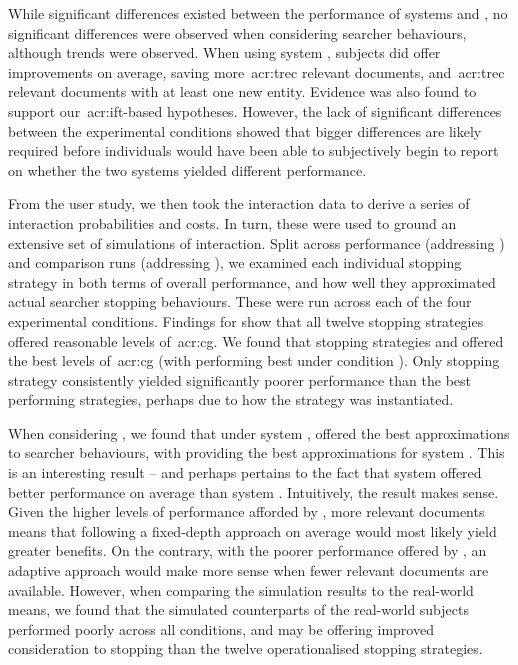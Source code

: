 While significant differences existed between the performance of systems  and , no significant differences were observed when considering searcher behaviours, although trends were observed. When using system , subjects did offer improvements on average, saving more~\gls{acr:trec} relevant documents, and~\gls{acr:trec} relevant documents with at least one new entity. Evidence was also found to support our~\gls{acr:ift}-based hypotheses. However, the lack of significant differences between the experimental conditions showed that bigger differences are likely required before individuals would have been able to subjectively begin to report on whether the two systems yielded different performance.

From the user study, we then took the interaction data to derive a series of interaction probabilities and costs. In turn, these were used to ground an extensive set of simulations of interaction. Split across performance (addressing ) and comparison runs (addressing ), we examined each individual stopping strategy in both terms of overall performance, and how well they approximated actual searcher stopping behaviours. These were run across each of the four experimental conditions. Findings for  show that all twelve stopping strategies offered reasonable levels of~\gls{acr:cg}. We found that stopping strategies  and  offered the best levels of~\gls{acr:cg} (with  performing best under condition ). Only stopping strategy  consistently yielded significantly poorer performance than the best performing strategies, perhaps due to how the strategy was instantiated.

When considering , we found that under system ,  offered the best approximations to searcher behaviours, with  providing the best approximations for system . This is an interesting result -- and perhaps pertains to the fact that system  offered better performance on average than system . Intuitively, the result makes sense. Given the higher levels of performance afforded by , more relevant documents means that following a fixed-depth approach on average would most likely yield greater benefits. On the contrary, with the poorer performance offered by , an adaptive approach would make more sense when fewer relevant documents are available. However, when comparing the simulation results to the real-world means, we found that the simulated counterparts of the real-world subjects performed poorly across all conditions, and may be offering improved consideration to stopping than the twelve operationalised stopping strategies.

